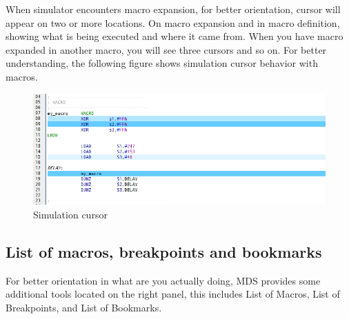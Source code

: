         When simulator encounters macro expansion, for better orientation, cursor will appear on two or more locations.
        On macro expansion and in macro definition, showing what is being executed and where it came from. When you have
        macro expanded in another macro, you will see three cursors and so on. For better understanding, the following
        figure shows simulation cursor behavior with macros.
        \begin{figure}[h!]
            \centering
            \includegraphics[width=\textwidth]{img/simulationcursor2.png}
            \caption{Simulation cursor}
        \end{figure}

    \clearpage
    \subsection{List of macros, breakpoints and bookmarks}
        For better orientation in what are you actually doing, MDS provides some additional tools located on the right
        panel, this includes List of Macros, List of Breakpoints, and List of Bookmarks.

